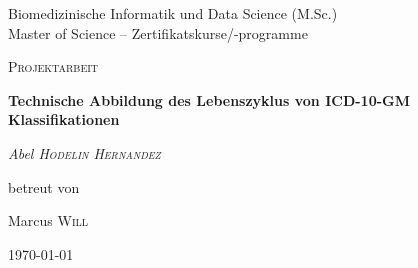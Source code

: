 \begin{titlepage}
		\thispagestyle{firstpage}
		\raggedright
		{\Large {\color{orange}Biomedizinische Informatik und Data Science (M.Sc.)\\}
			{\color{gray}Master of Science – Zertifikatskurse/-programme}
			\par}
		\vspace{1cm}
		\centering
		{\scshape\LARGE Projektarbeit\par}
		\vspace{1.5cm}
		{\huge \bfseries Technische Abbildung des Lebenszyklus von ICD-10-GM Klassifikationen\par}
		\vspace{2cm}
		{\Large \itshape Abel \textsc{Hodelin Hernandez}~\par}
		\vfill
		betreut von\par
		Marcus \textsc{Will}
		
		\vfill
		
		{\large \today\par}
	\end{titlepage}